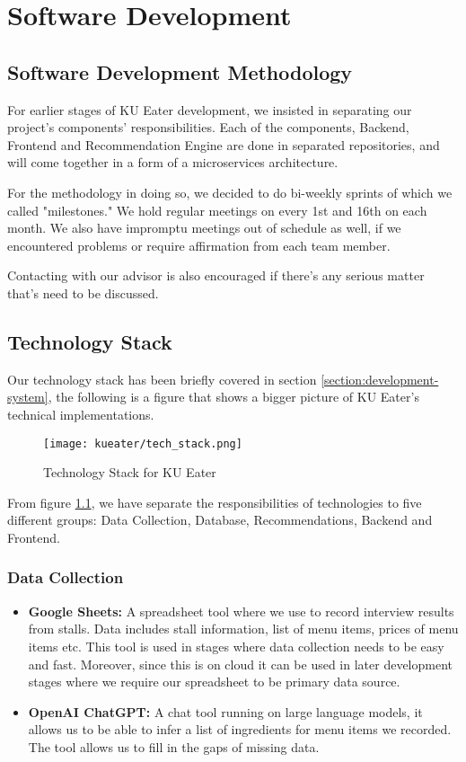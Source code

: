 \chapter{Software Development}
\label{chap:software-development}

\section{Software Development Methodology}
\label{section:software-development-methodology}
For earlier stages of KU Eater development, we insisted in separating our project's components' responsibilities.
Each of the components, Backend, Frontend and Recommendation Engine are done in separated repositories, and will come together in a form of a microservices architecture.

For the methodology in doing so, we decided to do bi-weekly sprints of which we called "milestones." We hold regular meetings on every 1st and 16th on each month.
We also have impromptu meetings out of schedule as well, if we encountered problems or require affirmation from each team member.

Contacting with our advisor is also encouraged if there's any serious matter that's need to be discussed.

\section{Technology Stack}
\label{section:technology-stack}
Our technology stack has been briefly covered in section \ref{section:development-system}, the following is a figure that shows a bigger picture of KU Eater's technical implementations.
\begin{figure}[H]
    \centering
    \texttt{[image: kueater/tech\_stack.png]}
    \caption{Technology Stack for KU Eater}
    \label{fig:tech-stack}
\end{figure}
From figure \ref{fig:tech-stack}, we have separate the responsibilities of technologies to five different groups: Data Collection, Database, Recommendations, Backend and Frontend.

\subsection{Data Collection}
\begin{itemize}[leftmargin=80pt]
    \item \textbf{Google Sheets:} A spreadsheet tool where we use to record interview results from stalls. Data includes stall information, list of menu items,
    prices of menu items etc. This tool is used in stages where data collection needs to be easy and fast. Moreover, since this is on cloud it can be used in later
    development stages where we require our spreadsheet to be primary data source.
    \item \textbf{OpenAI ChatGPT:} A chat tool running on large language models, it allows us to be able to infer a list of ingredients for menu items we recorded.
    The tool allows us to fill in the gaps of missing data.
\end{itemize}

